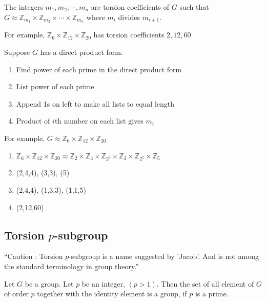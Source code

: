 \begin{definition}
	The integers $m_1,m_2,\cdots,m_n$ are torsion coefficients of $G$ such that $G \approx \mathbb{Z}_{m_1} \times \mathbb{Z}_{m_2} \times \cdots \times \mathbb{Z}_{m_n}$ where $m_i$ divides $m_{i+1}$.%
\end{definition}

For example, $\mathbb{Z}_6 \times \mathbb{Z}_{12} \times \mathbb{Z}_{20}$ has torsion coefficients $2, 12, 60$

\begin{remark} Suppose $G$ has a direct product form.%
	\begin{enumerate}[label=Step \arabic*]
		\item Find power of each prime in the direct product form
		\item List power of each prime
		\item Append 1s on left to make all lists to equal length
		\item Product of $i$th number on each list gives $m_i$
	\end{enumerate}
\end{remark}

For example, $G \approx \mathbb{Z}_6 \times \mathbb{Z}_{12} \times \mathbb{Z}_{20}$
\begin{enumerate}[label=Step \arabic*]
	\item $\mathbb{Z}_6 \times \mathbb{Z}_{12} \times \mathbb{Z}_{20} \approx \mathbb{Z}_2 \times \mathbb{Z}_3 \times \mathbb{Z}_{2^2} \times \mathbb{Z}_3 \times \mathbb{Z}_{2^2} \times \mathbb{Z}_5$
	\item (2,4,4), (3,3), (5)
	\item (2,4,4), (1,3,3), (1,1,5)
	\item (2,12,60)
\end{enumerate}

\subsection{Torsion $p$-subgroup}
\begin{commentary}
	``Caution : Torsion $p$-subgroup is a name suggested by 'Jacob'. And is not among the standard terminology in group theory.''
\end{commentary}

\begin{remark}
	Let $G$ be a group.
	Let $p$ be an integer, $(p > 1)$.
	Then the set of all element of $G$ of order $p$ together with the identity element is a group, if $p$ is a prime.
\end{remark}

